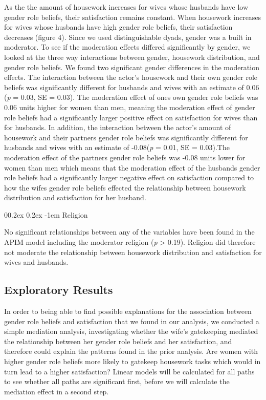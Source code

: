 \documentclass[
  man,floatsintext]{apa6}
\makeatletter
\let\oldparagraph\paragraph
\renewcommand{\paragraph}[1]{\oldparagraph{#1}\mbox{}}
\renewcommand{\paragraph}{\@startsection{paragraph}{4}{\parindent}%
  {0\baselineskip \@plus 0.2ex \@minus 0.2ex}%
  {-1em}%
  {\normalfont\normalsize\bfseries\itshape\typesectitle}}
\makeatother
\begin{document}
As the the amount of housework increases for wives whose husbands have low gender role beliefs, their satisfaction remains constant. When housework increases for wives whose husbands have high gender role beliefs, their satisfaction decreases (figure 4).
Since we used distinguishable dyads, gender was a built in moderator. To see if the moderation effects differed significantly by gender, we looked at the three way interactions between gender, housework distribution, and gender role beliefs. We found two significant gender differences in the moderation effects. The interaction between the actor's housework and their own gender role beliefs was significantly different for husbands and wives with an estimate of 0.06 (\emph{p} = 0.03, SE = 0.03). The moderation effect of ones own gender role beliefs was 0.06 units higher for women than men, meaning the moderation effect of gender role beliefs had a significantly larger positive effect on satisfaction for wives than for husbands.
In addition, the interaction between the actor's amount of housework and their partners gender role beliefs was significantly different for husbands and wives with an estimate of -0.08(\emph{p} = 0.01, SE = 0.03).The moderation effect of the partners gender role beliefs was -0.08 units lower for women than men which means that the moderation effect of the husbands gender role beliefs had a significantly larger negative effect on satisfaction compared to how the wifes gender role beliefs effected the relationship between housework distribution and satisfaction for her husband.

\hypertarget{religion}{%
\paragraph{Religion}\label{religion}}

No significant relationships between any of the variables have been found in the APIM model including the moderator religion (\emph{p} \textgreater{} 0.19). Religion did therefore not moderate the relationship between housework distribution and satisfaction for wives and husbands.

\hypertarget{exploratory-results}{%
\subsection{Exploratory Results}\label{exploratory-results}}

In order to being able to find possible explanations for the association between gender role beliefs and satisfaction that we found in our analysis, we conducted a simple mediation analysis, investigating whether the wife's gatekeeping mediated the relationship between her gender role beliefs and her satisfaction, and therefore could explain the patterns found in the prior analysis. Are women with higher gender role beliefs more likely to gatekeep housework tasks which would in turn lead to a higher satisfaction?
Linear models will be calculated for all paths to see whether all paths are significant first, before we will calculate the mediation effect in a second step.
\end{document}
